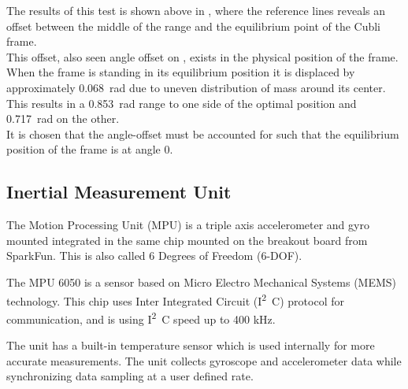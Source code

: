 \begin{minipage}{\linewidth}
\begin{minipage}{0.45\linewidth}
\begin{figure}[H]
  			\centering
  			\captionsetup{justification=centering}
  			\vspace{-.5cm}
  			\label{PotentiometerResolutionRadDeg}
  		\end{figure}\vspace{-5mm}
  	\end{minipage}
\end{minipage}

The results of this test is shown above in , where the reference lines reveals an offset between the middle of the range and the equilibrium point of the Cubli frame.\\
This offset, also seen angle offset on , exists in the physical position of the frame. When the frame is standing in its equilibrium position it is displaced by approximately \SI{0,068}{rad} due to uneven distribution of mass around its center.\\
This results in a \SI{0,853}{rad} range to one side of the optimal position and \SI{0,717}{rad} on the other.\\
It is chosen that the angle-offset must be accounted for such that the equilibrium position of the frame is at angle 0.


\subsection{Inertial Measurement Unit}
The Motion Processing Unit (MPU) is a triple axis accelerometer and gyro mounted integrated in the same chip mounted on the breakout board from SparkFun. This is also called 6 Degrees of Freedom (6-DOF).

The MPU 6050 is a sensor based on Micro Electro Mechanical Systems (MEMS) technology. This chip uses Inter Integrated Circuit (\si{I^2C}) protocol for communication, and is using \si{I^2C} speed up to 400 kHz. 

The unit has a built-in temperature sensor which is used internally for more accurate measurements.
The unit collects gyroscope and accelerometer data while synchronizing data sampling at a user defined rate. 

